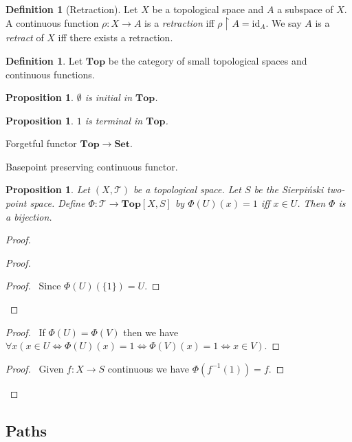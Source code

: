\documentclass{book}
\let\qed\relax
\newtheorem{prop}[ax]{Proposition}
\theoremstyle{definition}
\newtheorem{df}[ax]{Definition}
\newcommand{\id}[1]{\ensuremath{\mathrm{id}_{#1}}}
\newcommand{\inv}[1]{\ensuremath{{#1}^{-1}}}
\newcommand{\Top}{\ensuremath{\mathbf{Top}}}
\begin{document}
\begin{df}[Retraction]
Let $X$ be a topological space and $A$ a subspace of $X$. A continuous function $\rho : X \rightarrow A$ is a \emph{retraction} iff $\rho \restriction A = \id{A}$. We say $A$ is a \emph{retract} of $X$ iff there exists a retraction.
\end{df}

\begin{df}
Let $\mathbf{Top}$ be the category of small topological spaces and continuous functions.
\end{df}

\begin{prop}
$\emptyset$ is initial in $\mathbf{Top}$.
\end{prop}

\begin{prop}
$1$ is terminal in $\mathbf{Top}$.
\end{prop}

Forgetful functor $\mathbf{Top} \rightarrow \mathbf{Set}$.

Basepoint preserving continuous functor.

\begin{prop}
Let $(X, \mathcal{T})$ be a topological space. Let $S$ be the Sierpi\'{n}ski two-point space. Define $\Phi : \mathcal{T} \rightarrow \Top[X,S]$ by $\Phi(U)(x) = 1$ iff $x \in U$. Then $\Phi$ is a bijection.
\end{prop}

\begin{proof}
\pf
{}
\begin{proof}
	\begin{proof}
		\pf\ Since $\Phi(U)(\{1\}) = U$.
	\end{proof}
\end{proof}
\begin{proof}
	\pf\ If $\Phi(U) = \Phi(V)$ then we have $\forall x (x \in U \Leftrightarrow \Phi(U)(x) = 1 \Leftrightarrow \Phi(V)(x) = 1 \Leftrightarrow x \in V)$.
\end{proof}
\begin{proof}
	\pf\ Given $f : X \rightarrow S$ continuous we have $\Phi(\inv{f}(1)) = f$.
\end{proof}
\qed
\end{proof}

\subsection{Paths}
\end{document}
